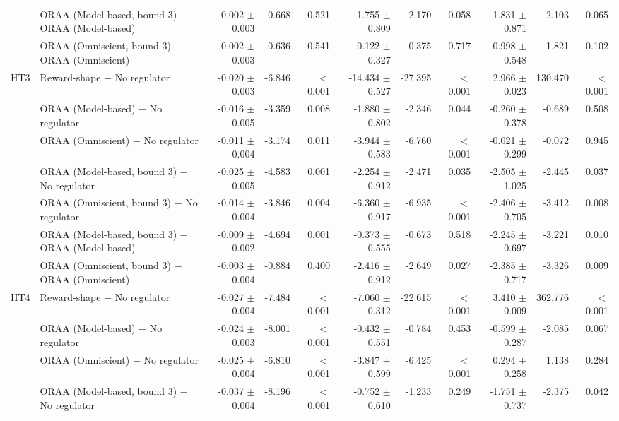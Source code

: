 \begin{tabular}{llrrrrrrrrr}
 & ORAA (Model-based, bound 3) $-$ ORAA (Model-based) & -0.002 $\pm$ 0.003 & -0.668 & 0.521 & 1.755 $\pm$ 0.809 & 2.170 & 0.058 & -1.831 $\pm$ 0.871 & -2.103 & 0.065 \\
 & ORAA (Omniscient, bound 3) $-$ ORAA (Omniscient) & -0.002 $\pm$ 0.003 & -0.636 & 0.541 & -0.122 $\pm$ 0.327 & -0.375 & 0.717 & -0.998 $\pm$ 0.548 & -1.821 & 0.102 \\
\addlinespace
HT3 & Reward-shape $-$ No regulator & -0.020 $\pm$ 0.003 & -6.846 & $<$0.001 & -14.434 $\pm$ 0.527 & -27.395 & $<$0.001 & 2.966 $\pm$ 0.023 & 130.470 & $<$0.001 \\
 & ORAA (Model-based) $-$ No regulator & -0.016 $\pm$ 0.005 & -3.359 & 0.008 & -1.880 $\pm$ 0.802 & -2.346 & 0.044 & -0.260 $\pm$ 0.378 & -0.689 & 0.508 \\
 & ORAA (Omniscient) $-$ No regulator & -0.011 $\pm$ 0.004 & -3.174 & 0.011 & -3.944 $\pm$ 0.583 & -6.760 & $<$0.001 & -0.021 $\pm$ 0.299 & -0.072 & 0.945 \\
 & ORAA (Model-based, bound 3) $-$ No regulator & -0.025 $\pm$ 0.005 & -4.583 & 0.001 & -2.254 $\pm$ 0.912 & -2.471 & 0.035 & -2.505 $\pm$ 1.025 & -2.445 & 0.037 \\
 & ORAA (Omniscient, bound 3) $-$ No regulator & -0.014 $\pm$ 0.004 & -3.846 & 0.004 & -6.360 $\pm$ 0.917 & -6.935 & $<$0.001 & -2.406 $\pm$ 0.705 & -3.412 & 0.008 \\
 & ORAA (Model-based, bound 3) $-$ ORAA (Model-based) & -0.009 $\pm$ 0.002 & -4.694 & 0.001 & -0.373 $\pm$ 0.555 & -0.673 & 0.518 & -2.245 $\pm$ 0.697 & -3.221 & 0.010 \\
 & ORAA (Omniscient, bound 3) $-$ ORAA (Omniscient) & -0.003 $\pm$ 0.004 & -0.884 & 0.400 & -2.416 $\pm$ 0.912 & -2.649 & 0.027 & -2.385 $\pm$ 0.717 & -3.326 & 0.009 \\
\addlinespace
HT4 & Reward-shape $-$ No regulator & -0.027 $\pm$ 0.004 & -7.484 & $<$0.001 & -7.060 $\pm$ 0.312 & -22.615 & $<$0.001 & 3.410 $\pm$ 0.009 & 362.776 & $<$0.001 \\
 & ORAA (Model-based) $-$ No regulator & -0.024 $\pm$ 0.003 & -8.001 & $<$0.001 & -0.432 $\pm$ 0.551 & -0.784 & 0.453 & -0.599 $\pm$ 0.287 & -2.085 & 0.067 \\
 & ORAA (Omniscient) $-$ No regulator & -0.025 $\pm$ 0.004 & -6.810 & $<$0.001 & -3.847 $\pm$ 0.599 & -6.425 & $<$0.001 & 0.294 $\pm$ 0.258 & 1.138 & 0.284 \\
 & ORAA (Model-based, bound 3) $-$ No regulator & -0.037 $\pm$ 0.004 & -8.196 & $<$0.001 & -0.752 $\pm$ 0.610 & -1.233 & 0.249 & -1.751 $\pm$ 0.737 & -2.375 & 0.042 \\

\end{tabular}
